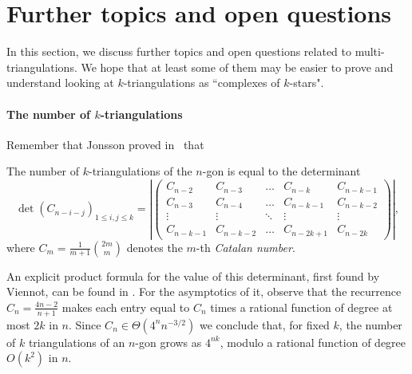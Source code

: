 \documentclass[12pt]{amsart}
\begin{document}






\section{Further topics and open questions}\label{sectionopen}

In this section, we discuss further topics and open questions related to multi-triangulations. We hope that at least some of them may be easier to prove and understand looking at $k$-triangulations as ``complexes of $k$-stars".


\bigskip


\paragraph{{\sc The number of $k$-triangulations}}

Remember that Jonsson proved in~\cite{j-gt-03} that

\begin{theorem}\label{triangenumeration}
The number of $k$-triangulations of the $n$-gon is equal to the determinant
$$\det(C_{n-i-j})_{1\le i,j\le k}=\left|\begin{pmatrix} C_{n-2} & C_{n-3} & \ldots & C_{n-k} & C_{n-k-1} \\ C_{n-3} & C_{n-4} & \ldots & C_{n-k-1} & C_{n-k-2} \\ \vdots & \vdots & \ddots & \vdots & \vdots \\ C_{n-k-1} & C_{n-k-2} & \ldots & C_{n-2k+1} & C_{n-2k} \end{pmatrix}\right|,$$
where $C_m=\frac{1}{m+1}{ 2m \choose m}$ denotes the $m$-th \emph{Catalan number}.
\end{theorem}

\begin{remark}\label{rem:triangenumeration}
\rm
An explicit product formula for the value of this determinant, first found by Viennot, can be found in \cite[p. 130]{j-gt-03}. For the asymptotics of it, observe that the recurrence $C_{n} = \frac{4n-2}{n+1}$ makes each entry equal to $C_n$ times a rational function of degree at most $2k$ in $n$.
Since $C_n \in \Theta(4^n n^{-3/2})$ we conclude that, for fixed $k$, the number of $k$ triangulations of an $n$-gon grows as $4^{nk}$, modulo a rational function of degree $O(k^2)$ in $n$.
\end{remark}
\end{document}
